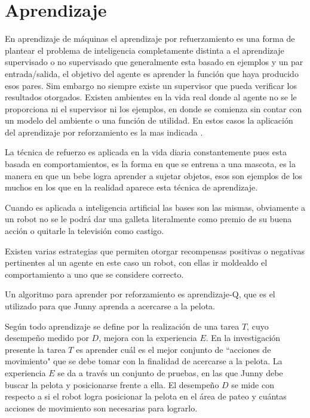 
\section{Aprendizaje}\label{aprendizaje}
En aprendizaje de m\'aquinas el aprendizaje por refuerzamiento es una forma de plantear el problema de inteligencia completamente distinta a el aprendizaje supervisado o no supervisado que generalmente esta basado en ejemplos y un par entrada/salida, el objetivo del agente es aprender la funci\'on que haya producido esos pares. Sim embargo no siempre existe un supervisor que pueda verificar los resultados otorgados.
Existen ambientes en la vida real donde al agente no se le proporciona ni el supervisor ni los ejemplos, en donde se comienza sin contar con un modelo del ambiente o una funci\'on de utilidad. En estos casos la aplicaci\'on del aprendizaje por reforzamiento es la mas indicada \cite{peterAndNorvig}.

La t\'ecnica de refuerzo es aplicada en la vida diaria constantemente pues esta basada en comportamientos, es la forma en que se entrena a una mascota, es la manera en que un bebe logra aprender a sujetar objetos, esos son ejemplos de los muchos en los que en la realidad aparece esta t\'ecnica de aprendizaje.

Cuando es aplicada a inteligencia artificial las bases son las mismas, obviamente a un robot no se le podr\'a dar una galleta literalmente como premio de su buena acci\'on o quitarle la televisi\'on como castigo.
 
Existen varias estrategias que permiten otorgar recompensas positivas o negativas pertinentes al un agente en este caso un robot, con ellas ir moldealdo el comportamiento a uno que se considere correcto.

Un algoritmo para aprender por reforzamiento es aprendizaje-Q, que es el utilizado para que Junny aprenda a acercarse a la pelota.
 


Según \cite{Mitchell} todo aprendizaje se define por la realización de una tarea $T$, cuyo desempeño medido por $D$, mejora con la experiencia $E$. En la investigación presente la tarea $T$ es aprender cuál es el mejor conjunto de ``acciones de movimiento" que se debe tomar con la finalidad de acercarse a la pelota. La experiencia $E$ se da a través un conjunto de pruebas, en las que Junny debe buscar la pelota y posicionarse frente a ella. El desempeño $D$ se mide con respecto a si el robot logra posicionar la pelota en el área de pateo y cuántas acciones de movimiento son necesarias para lograrlo.

